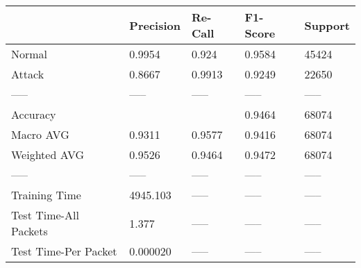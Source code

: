 \begin{tabular}{lllll}
\toprule
{} & Precision & Re-Call & F1-Score & Support \\
\midrule
Normal                &    0.9954 &   0.924 &   0.9584 &   45424 \\
Attack                &    0.8667 &  0.9913 &   0.9249 &   22650 \\
-----                 &     ----- &   ----- &    ----- &   ----- \\
Accuracy              &           &         &   0.9464 &   68074 \\
Macro AVG             &    0.9311 &  0.9577 &   0.9416 &   68074 \\
Weighted AVG          &    0.9526 &  0.9464 &   0.9472 &   68074 \\
-----                 &     ----- &   ----- &    ----- &   ----- \\
Training Time         &  4945.103 &   ----- &    ----- &   ----- \\
Test Time-All Packets &     1.377 &   ----- &    ----- &   ----- \\
Test Time-Per Packet  &  0.000020 &   ----- &    ----- &   ----- \\
\bottomrule
\end{tabular}
